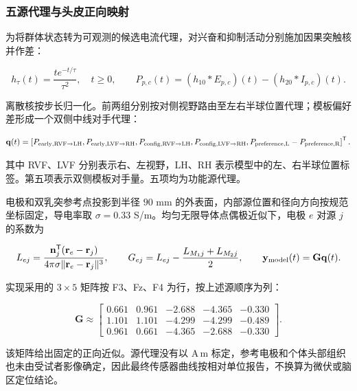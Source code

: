 \subsubsection{五源代理与头皮正向映射}

为将群体状态转为可观测的候选电流代理，对兴奋和抑制活动分别施加因果突触核并作差：

\begin{equation}
h_\tau(t)=\frac{t e^{-t/\tau}}{\tau^2},\quad t\ge0,\qquad
P_{p,c}(t)=(h_{10}*E_{p,c})(t)-(h_{20}*I_{p,c})(t).
\end{equation}

离散核按步长归一化。前两组分别按对侧视野路由至左右半球位置代理；模板偏好差形成一个双侧中线对手代理：

\begin{equation}
\mathbf q(t)=\left[
P_{\rm early,RVF\to LH},P_{\rm early,LVF\to RH},
P_{\rm config,RVF\to LH},P_{\rm config,LVF\to RH},
P_{\rm preference,L}-P_{\rm preference,R}
\right]^{\mathsf T}.
\end{equation}

其中 RVF、LVF 分别表示右、左视野，LH、RH 表示模型中的左、右半球位置标签。第五项表示双侧模板对手量。五项均为功能源代理。

电极和双乳突参考点投影到半径 \(90\) mm 的外表面，内部源位置和径向方向按规范坐标固定，导电率取 \(\sigma=0.33\) S/m。均匀无限导体点偶极近似下，电极 \(e\) 对源 \(j\) 的系数为

\begin{equation}
L_{ej}=\frac{\mathbf n_j^{\mathsf T}(\mathbf r_e-\mathbf r_j)}
{4\pi\sigma\lVert\mathbf r_e-\mathbf r_j\rVert^3},\qquad
G_{ej}=L_{ej}-\frac{L_{M_1j}+L_{M_2j}}{2},\qquad
\mathbf y_{\rm model}(t)=\mathbf G\mathbf q(t).
\end{equation}

实现采用的 \(3\times5\) 矩阵按 F3、Fz、F4 为行，按上述源顺序为列：

\begin{equation}
\mathbf G\approx\begin{bmatrix}
0.661&0.961&-2.688&-4.365&-0.330\\
1.101&1.101&-4.299&-4.299&-0.489\\
0.961&0.661&-4.365&-2.688&-0.330
\end{bmatrix}.
\end{equation}

该矩阵给出固定的正向近似。源代理没有以 \(\mathrm{A\,m}\) 标定，参考电极和个体头部组织也未由受试者影像确定，因此最终传感器曲线按相对单位报告，不换算为微伏或脑区定位结论。

